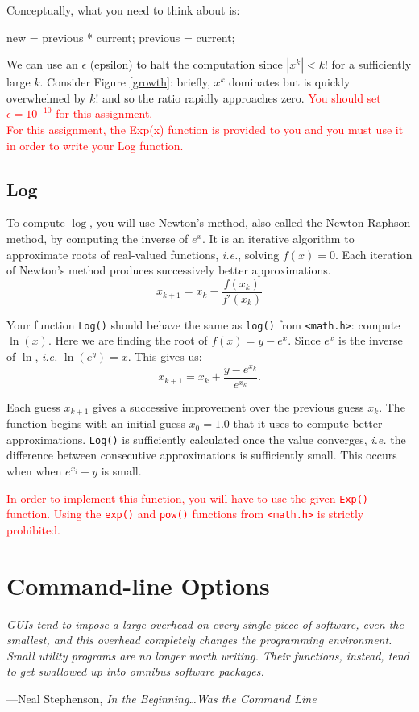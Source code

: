 \documentclass[11pt]{article}
\begin{document}
Conceptually, what you need to think about is:
\begin{codelisting}{}
  new = previous * current;
  previous = current;
\end{codelisting}

We can use an $\epsilon$ (epsilon) to halt the computation since
$|x^k| < k!$ for a sufficiently large $k$.  Consider Figure \ref{growth}:
briefly, $x^k$ dominates but is quickly overwhelmed by $k!$ and so
the ratio rapidly approaches zero.
\textcolor{red}{You should set $\epsilon = 10^{-10}$ for this assignment.} \\

\textcolor{red}{For this assignment, the Exp(x) function is provided to
you and you must use it in order to write your Log function.}


\subsection{Log}

To compute $\log$, you will use Newton's method, also called the Newton-Raphson
method, by computing the inverse of $e^x$. It is an iterative algorithm
to approximate roots of real-valued functions, \textit{i.e.}\xspace,
solving $f(x) = 0$. Each iteration of Newton's method produces
successively better approximations.
\[
  x_{k+1} = x_k - \frac{f(x_k)}{f'(x_k)}
\]

Your function \texttt{Log()} should behave the same as \texttt{log()} from
\texttt{<math.h>}: compute $\ln(x)$. Here we are finding the root of $f(x) = y - e^x$. Since $e^x$ is the inverse of $\ln$, \textit{i.e.} $\ln(e^y) = x$. This gives us:
\[
  x_{k+1} = x_k + \frac{y - e^{x_k}}{e^{x_k}}.
\]

Each guess $x_{k+1}$ gives a successive improvement over the previous guess
$x_k$. The function begins with an initial guess $x_0 = 1.0$ that it
uses to compute better approximations. \texttt{Log()} is sufficiently
calculated once the value converges, \textit{i.e.}\xspace the difference
between consecutive approximations is sufficiently small. This occurs
when when $e^{x_{i}} - y$ is small.

\textcolor{red}{In order to implement this function, you will have to use the given \texttt{Exp()}
function. Using the \texttt{exp()} and \texttt{pow()} functions from \texttt{<math.h>} is strictly
prohibited.}

\section{Command-line Options}
\textwidth
\epigraph{\emph{GUIs tend to impose a large overhead on every single piece of
    software, even the smallest, and this overhead completely changes the
    programming environment. Small utility programs are no longer worth writing.
    Their functions, instead, tend to get swallowed up into omnibus software
packages.}}{---Neal Stephenson, \emph{In the Beginning\ldots Was the Command
Line}}
\end{document}
